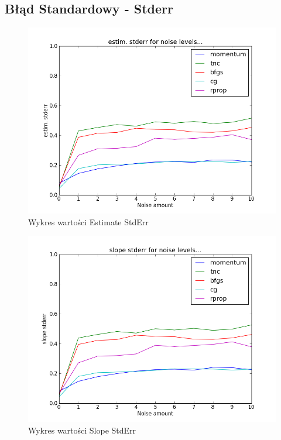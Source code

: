 \documentclass[a4paper]{article}
\begin{document}
\subsection{Błąd Standardowy - Stderr}
\begin{figure}[pht]
 \centering
 \includegraphics[scale=0.5]{../compare_plots/compare_plot_estim__stderr}
 \caption{Wykres wartości Estimate StdErr}\label{rys:plot1}
\end{figure}
\begin{figure}[pht]
 \centering
 \includegraphics[scale=0.5]{../compare_plots/compare_plot_slope_stderr}
 \caption{Wykres wartości Slope StdErr}\label{rys:plot1}
\end{figure}
\end{document}
